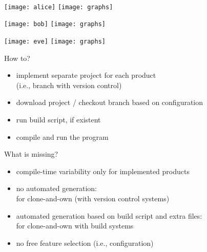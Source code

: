 \begin{frame}{\myframetitle}
	\begin{mycolumns}[columns=2,widths={50,50},animation=none]
		\vspace{3mm}		
	\mynextcolumn
	\end{mycolumns}
\end{frame}

\begin{frame}{\myframetitle}
	\begin{mycolumns}[widths={30}]
		\centering~

		\texttt{[image: alice]}
		\texttt{[image: graphs]}

		\texttt{[image: bob]}
		\texttt{[image: graphs]}

		\texttt{[image: eve]}
		\texttt{[image: graphs]}
	\mynextcolumn
		\begin{definition}{How to?}
			\begin{itemize}
				\item implement separate project for each product\\(i.e., branch with version control)
				\item download project / checkout branch based on configuration
				\item run build script, if existent
				\item compile and run the program
			\end{itemize}
		\end{definition}
		\begin{note}{What is missing?}
			\begin{itemize}
				\item compile-time variability only for implemented products
				\item no automated generation:\\\hfill for clone-and-own (with version control systems)
				\item automated generation based on build script and extra files:\\\hfill for clone-and-own with build systems
				\item no free feature selection (i.e., configuration)
			\end{itemize}
		\end{note}
	\end{mycolumns}
\end{frame}

